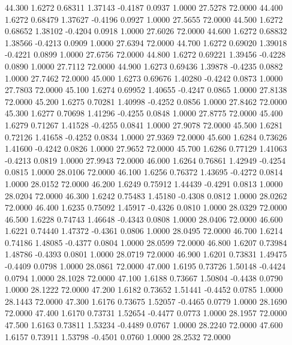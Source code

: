  44.300   1.6272   0.68311   1.37143  -0.4187   0.0937   1.0000  27.5278  72.0000
  44.400   1.6272   0.68479   1.37627  -0.4196   0.0927   1.0000  27.5655  72.0000
  44.500   1.6272   0.68652   1.38102  -0.4204   0.0918   1.0000  27.6026  72.0000
  44.600   1.6272   0.68832   1.38566  -0.4213   0.0909   1.0000  27.6394  72.0000
  44.700   1.6272   0.69020   1.39018  -0.4221   0.0899   1.0000  27.6756  72.0000
  44.800   1.6272   0.69221   1.39456  -0.4228   0.0890   1.0000  27.7112  72.0000
  44.900   1.6273   0.69436   1.39878  -0.4235   0.0882   1.0000  27.7462  72.0000
  45.000   1.6273   0.69676   1.40280  -0.4242   0.0873   1.0000  27.7803  72.0000
  45.100   1.6274   0.69952   1.40655  -0.4247   0.0865   1.0000  27.8138  72.0000
  45.200   1.6275   0.70281   1.40998  -0.4252   0.0856   1.0000  27.8462  72.0000
  45.300   1.6277   0.70698   1.41296  -0.4255   0.0848   1.0000  27.8775  72.0000
  45.400   1.6279   0.71267   1.41528  -0.4255   0.0841   1.0000  27.9078  72.0000
  45.500   1.6281   0.72126   1.41658  -0.4252   0.0834   1.0000  27.9369  72.0000
  45.600   1.6284   0.73626   1.41600  -0.4242   0.0826   1.0000  27.9652  72.0000
  45.700   1.6286   0.77129   1.41063  -0.4213   0.0819   1.0000  27.9943  72.0000
  46.000   1.6264   0.76861   1.42949  -0.4254   0.0815   1.0000  28.0106  72.0000
  46.100   1.6256   0.76372   1.43695  -0.4272   0.0814   1.0000  28.0152  72.0000
  46.200   1.6249   0.75912   1.44439  -0.4291   0.0813   1.0000  28.0204  72.0000
  46.300   1.6242   0.75483   1.45180  -0.4308   0.0812   1.0000  28.0262  72.0000
  46.400   1.6235   0.75092   1.45917  -0.4326   0.0810   1.0000  28.0329  72.0000
  46.500   1.6228   0.74743   1.46648  -0.4343   0.0808   1.0000  28.0406  72.0000
  46.600   1.6221   0.74440   1.47372  -0.4361   0.0806   1.0000  28.0495  72.0000
  46.700   1.6214   0.74186   1.48085  -0.4377   0.0804   1.0000  28.0599  72.0000
  46.800   1.6207   0.73984   1.48786  -0.4393   0.0801   1.0000  28.0719  72.0000
  46.900   1.6201   0.73831   1.49475  -0.4409   0.0798   1.0000  28.0861  72.0000
  47.000   1.6195   0.73726   1.50148  -0.4424   0.0794   1.0000  28.1028  72.0000
  47.100   1.6188   0.73667   1.50804  -0.4438   0.0790   1.0000  28.1222  72.0000
  47.200   1.6182   0.73652   1.51441  -0.4452   0.0785   1.0000  28.1443  72.0000
  47.300   1.6176   0.73675   1.52057  -0.4465   0.0779   1.0000  28.1690  72.0000
  47.400   1.6170   0.73731   1.52654  -0.4477   0.0773   1.0000  28.1957  72.0000
  47.500   1.6163   0.73811   1.53234  -0.4489   0.0767   1.0000  28.2240  72.0000
  47.600   1.6157   0.73911   1.53798  -0.4501   0.0760   1.0000  28.2532  72.0000
